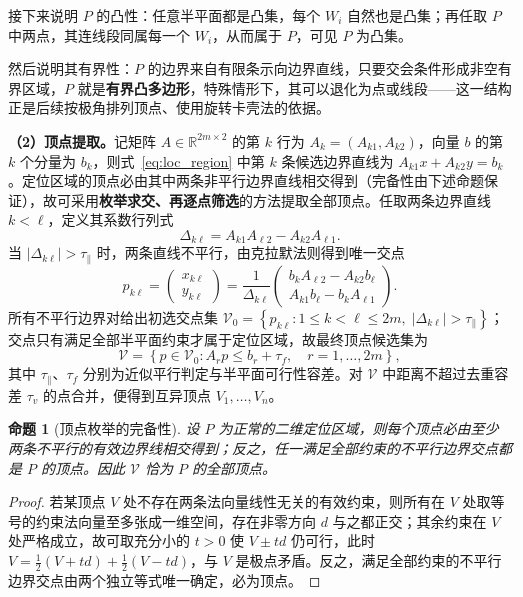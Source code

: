 \documentclass[withoutpreface]{cumcmthesis}
\newtheorem{proposition}{命题}
\begin{document}
接下来说明 $P$ 的凸性：任意半平面都是凸集，每个 $W_i$ 自然也是凸集；再任取 $P$ 中两点，其连线段同属每一个 $W_i$，从而属于 $P$，可见 $P$ 为凸集。

然后说明其有界性：$P$ 的边界来自有限条示向边界直线，只要交会条件形成非空有界区域，$P$ 就是\textbf{有界凸多边形}，特殊情形下，其可以退化为点或线段——这一结构正是后续按极角排列顶点、使用旋转卡壳法的依据。

\textbf{（2）顶点提取。}记矩阵 $A\in\mathbb R^{2m\times2}$ 的第 $k$ 行为 $A_k=(A_{k1},A_{k2})$，向量 $b$ 的第 $k$ 个分量为 $b_k$，则式~\eqref{eq:loc_region} 中第 $k$ 条候选边界直线为 $A_{k1}x+A_{k2}y=b_k$。定位区域的顶点必由其中两条非平行边界直线相交得到（完备性由下述命题保证），故可采用\textbf{枚举求交、再逐点筛选}的方法提取全部顶点。任取两条边界直线 $k<\ell$，定义其系数行列式
\begin{equation}\label{eq:det_kl}
\Delta_{k\ell}
=A_{k1}A_{\ell2}-A_{k2}A_{\ell1}.
\end{equation}
当 $|\Delta_{k\ell}|>\tau_{\parallel}$ 时，两条直线不平行，由克拉默法则得到唯一交点
\begin{equation}\label{eq:cramer_kl}
p_{k\ell}
=\begin{pmatrix}x_{k\ell}\\ y_{k\ell}\end{pmatrix}
=\frac{1}{\Delta_{k\ell}}
\begin{pmatrix}b_kA_{\ell2}-A_{k2}b_\ell\\ A_{k1}b_\ell-b_kA_{\ell1}\end{pmatrix}.
\end{equation}
所有不平行边界对给出初选交点集
$\mathcal V_0
=\left\{p_{k\ell}:1\leq k<\ell\leq2m,\;
|\Delta_{k\ell}|>\tau_{\parallel}\right\}$；
交点只有满足全部半平面约束才属于定位区域，故最终顶点候选集为
\begin{equation}\label{eq:V_filter}
\mathcal V
=
\left\{p\in\mathcal V_0:
A_rp\leq b_r+\tau_f,\quad r=1,\ldots,2m
\right\},
\end{equation}
其中 $\tau_{\parallel}$、$\tau_f$ 分别为近似平行判定与半平面可行性容差。对 $\mathcal V$ 中距离不超过去重容差 $\tau_v$ 的点合并，便得到互异顶点 $V_1,\ldots,V_n$。

\begin{proposition}[顶点枚举的完备性]\label{prop:vertex-complete}
设 $P$ 为正常的二维定位区域，则每个顶点必由至少两条不平行的有效边界线相交得到；反之，任一满足全部约束的不平行边界交点都是 $P$ 的顶点。因此 $\mathcal V$ 恰为 $P$ 的全部顶点。
\end{proposition}
\begin{proof}
若某顶点 $V$ 处不存在两条法向量线性无关的有效约束，则所有在 $V$ 处取等号的约束法向量至多张成一维空间，存在非零方向 $d$ 与之都正交；其余约束在 $V$ 处严格成立，故可取充分小的 $t>0$ 使 $V\pm td$ 仍可行，此时 $V=\frac12(V+td)+\frac12(V-td)$，与 $V$ 是极点矛盾。反之，满足全部约束的不平行边界交点由两个独立等式唯一确定，必为顶点。
\end{proof}
\end{document}
